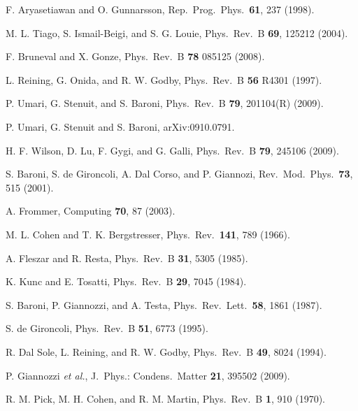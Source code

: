 \documentclass[twocolumn,prb,showpacs,superscriptaddress]{revtex4}
\begin{document}
\begin{thebibliography}{99}
F. Aryasetiawan and O. Gunnarsson,
Rep.\ Prog.\ Phys.\ {\bf 61}, 237 (1998). 

M. L. Tiago, S. Ismail-Beigi, and S. G. Louie,
Phys.\ Rev.\ B {\bf 69}, 125212 (2004).

F. Bruneval and X. Gonze,
Phys.\ Rev.\ B {\bf 78} 085125 (2008).

L. Reining, G. Onida, and R. W. Godby, 
Phys.\ Rev.\ B {\bf 56} R4301 (1997).

P. Umari, G. Stenuit, and S. Baroni,
Phys.\ Rev.\ B {\bf 79}, 201104(R) (2009).

P. Umari, G. Stenuit and S. Baroni,
arXiv:0910.0791.

H. F. Wilson, D. Lu, F. Gygi, and G. Galli,
Phys.\ Rev.\ B {\bf 79}, 245106 (2009).

S. Baroni, S. de Gironcoli, A. Dal Corso, and P. Giannozi, 
Rev.\ Mod.\ Phys.\ {\bf 73}, 515 (2001).

A. Frommer,
Computing {\bf 70}, 87 (2003).

M. L. Cohen and T. K. Bergstresser,
Phys.\ Rev.\ {\bf 141}, 789 (1966).

A. Fleszar and R. Resta,
Phys.\ Rev.\ B {\bf 31}, 5305 (1985).

K. Kunc and E. Tosatti,
Phys.\ Rev.\ B {\bf 29}, 7045 (1984).

S. Baroni, P. Giannozzi, and A. Testa,
Phys.\ Rev.\ Lett.\ {\bf 58}, 1861 (1987).

S. de Gironcoli,
Phys.\ Rev.\ B {\bf 51}, 6773 (1995).

R. Dal Sole, L. Reining, and R. W. Godby,
Phys.\ Rev.\ B {\bf 49}, 8024 (1994).

P. Giannozzi {\it et al.},
J.\ Phys.: Condens.\ Matter {\bf 21}, 395502 (2009).

R. M. Pick, M. H. Cohen, and R. M. Martin,
Phys.\ Rev.\ B {\bf 1}, 910 (1970). 


\end{thebibliography}
\end{document}
